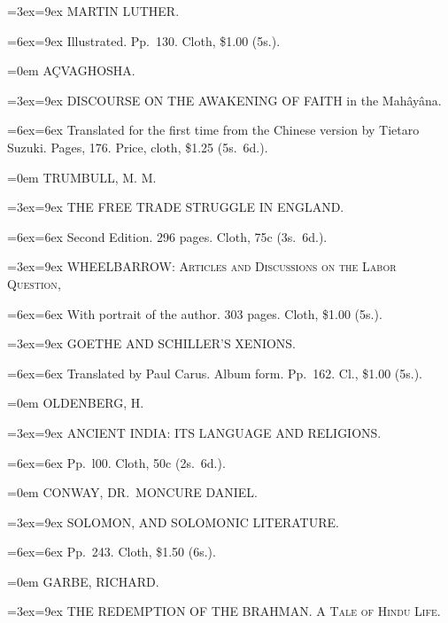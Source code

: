 \documentclass[oneside]{book}
\begin{document}
{\parindent=3ex\hangindent=9ex \small
MARTIN LUTHER.
\nopagebreak

\parindent=6ex\hangindent=9ex\footnotesize
Illustrated. Pp.~130. Cloth, \$1.00 (5s.).
\smallskip


\parindent=0em \normalsize
AÇVAGHOSHA.
\nopagebreak

\parindent=3ex\hangindent=9ex \small
DISCOURSE ON THE AWAKENING OF FAITH in the Mahâyâna.
\nopagebreak

\parindent=6ex\hangindent=6ex\footnotesize
Translated for the first time from the Chinese version by Tietaro
Suzuki. Pages, 176. Price, cloth, \$1.25 (5s.~6d.).
\medskip


\parindent=0em \normalsize
TRUMBULL, M. M.
\nopagebreak

\parindent=3ex\hangindent=9ex \small
THE FREE TRADE STRUGGLE IN ENGLAND.
\nopagebreak

\parindent=6ex\hangindent=6ex\footnotesize
Second Edition. 296 pages. Cloth, 75c (3s.~6d.).
\smallskip

\parindent=3ex\hangindent=9ex \small
WHEELBARROW: \textsc{Articles and Discussions on the Labor Question},
\nopagebreak

\parindent=6ex\hangindent=6ex\footnotesize
With portrait of the author. 303 pages. Cloth, \$1.00 (5s.).
\smallskip

\parindent=3ex\hangindent=9ex \small
GOETHE AND SCHILLER'S XENIONS.
\nopagebreak

\parindent=6ex\hangindent=6ex\footnotesize
Translated by Paul Carus. Album form. Pp.~162. Cl., \$1.00 (5s.).
\medskip


\parindent=0em \normalsize
OLDENBERG, H.
\nopagebreak

\parindent=3ex\hangindent=9ex \small
ANCIENT INDIA: ITS LANGUAGE AND RELIGIONS.
\nopagebreak

\parindent=6ex\hangindent=6ex\footnotesize
Pp.~l00. Cloth, 50c (2s.~6d.).
\medskip


\parindent=0em \normalsize
CONWAY, DR.\ MONCURE DANIEL.
\nopagebreak

\parindent=3ex\hangindent=9ex \small
SOLOMON, AND SOLOMONIC LITERATURE.
\nopagebreak

\parindent=6ex\hangindent=6ex\footnotesize
Pp.~243. Cloth, \$1.50 (6s.).
\medskip


\parindent=0em \normalsize
GARBE, RICHARD.
\nopagebreak

\parindent=3ex\hangindent=9ex \small
THE REDEMPTION OF THE BRAHMAN\@. \textsc{A Tale of Hindu Life}.
\nopagebreak

}
\end{document}
